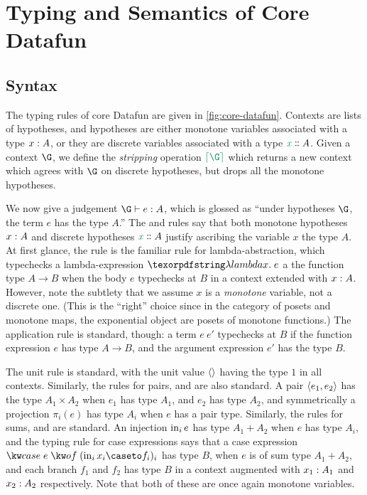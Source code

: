 \section{Typing and Semantics of Core Datafun}
\label{sec:typing-and-semantics}



\subsection{Syntax}

The typing rules of core Datafun are given in \cref{fig:core-datafun}. Contexts
are lists of hypotheses, and hypotheses are either monotone variables associated
with a type ${x} : {A}$, or they are discrete variables associated with a type $\hd
x A$. Given a context $\G$, we define the \emph{stripping} operation
$\stripcx\G$ which returns a new context which agrees with $\G$ on discrete
hypotheses, but drops all the monotone hypotheses.

We now give a judgement $\J{e}{\G}{A}$, which is glossed as ``under
hypotheses $\G$, the term $e$ has the type $A$.'' The  and 
rules say that both monotone hypotheses ${x} : {A}$ and discrete hypotheses
$\hd x A$ justify ascribing the variable $x$ the type $A$. At first glance,
the  rule is the familiar rule for lambda-abstraction, which
typechecks a lambda-expression $\fnof x e$ a the function type $A \to B$
when the body $e$ typechecks at $B$ in a context extended with ${x} : {A}$. However, note the subtlety that we assume $x$ is a \emph{monotone}
variable, not a discrete one. (This is the ``right'' choice since in the
category of posets and monotone maps, the exponential object are posets of
monotone functions.) The application rule  is standard, though: a
term $e\>e'$ typechecks at $B$ if the function expression $e$ has type
$A \to B$, and the argument expression $e'$ has the type $B$.

The unit rule  is standard, with the unit value $\langle{}\rangle$ having
the type $1$ in all contexts. Similarly, the rules for pairs,  and
 are also standard. A pair $\langle{e_1, e_2}\rangle$ has the type
$A_1 \times A_2$ when $e_1$ has type $A_1$, and $e_2$ has type $A_2$, and
symmetrically a projection $\pi_i(e)$ has type $A_i$ when $e$ has a pair
type. Similarly, the rules for sums,  and  are standard.
An injection $\mathrm{in}_{i}\, e$ has type $A_1 + A_2$ when $e$ has type $A_i$, and
the typing rule for case expressions  says that a case
expression $\ecase{e} (\inj i {x_i} \caseto f_i)_i$ has type $B$, when
$e$ is of sum type $A_1 + A_2$, and each branch $f_1$ and $f_2$ has type $B$
in a context augmented with ${x_1} : {A_1}$ and ${x_2} : {A_2}$ respectively.
Note that both of these are once again monotone variables.

